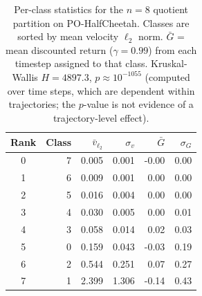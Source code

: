 \begin{table}[h]
\centering
\small
\begin{tabular}{crrrrr}
\toprule
Rank & Class & $\bar{v}_{\ell_2}$ & $\sigma_{v}$ & $\bar{G}$ & $\sigma_G$ \\
\midrule
  0 & 7 & 0.005 & 0.001 & -0.00 & 0.00 \\
  1 & 6 & 0.009 & 0.001 & 0.00 & 0.00 \\
  2 & 5 & 0.016 & 0.004 & 0.00 & 0.00 \\
  3 & 4 & 0.030 & 0.005 & 0.00 & 0.01 \\
  4 & 3 & 0.058 & 0.014 & 0.02 & 0.03 \\
  5 & 0 & 0.159 & 0.043 & -0.03 & 0.19 \\
  6 & 2 & 0.544 & 0.251 & 0.07 & 0.27 \\
  7 & 1 & 2.399 & 1.306 & -0.14 & 0.43 \\
\bottomrule
\end{tabular}
\caption{Per-class statistics for the $n{=}8$ quotient partition on
PO-HalfCheetah. Classes are sorted by mean velocity $\ell_2$ norm.
$\bar{G}$ = mean discounted return ($\gamma{=}0.99$) from each timestep
assigned to that class. Kruskal-Wallis $H=4897.3$, $p \approx 10^{-1055}$ (computed over time steps, which are dependent within trajectories; the $p$-value is not evidence of a trajectory-level effect).\vspace{-4pt}}
\label{tab:halfcheetah_class_returns}
\end{table}